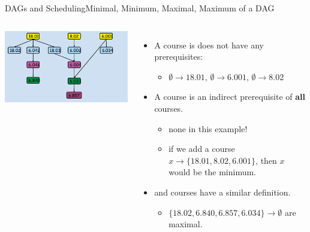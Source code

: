 \begin{frame}{DAGs and Scheduling}{Minimal, Minimum, Maximal, Maximum of a DAG}
  \begin{columns}
      \includegraphics[width=1\textwidth]{../img/greedy_schedule}

    \begin{itemize}
    \item A  course is does not have any prerequisites:
    \begin{itemize}
      \item $\emptyset \to 18.01$, $\emptyset \to 6.001$, $\emptyset \to  8.02$
    \end{itemize}\bigskip

    \item A  course is an indirect prerequisite of {\bf all} courses.
    \begin{itemize}
      \item none in this example!
      \item if we add a course $x \to \{18.01, 8.02, 6.001\}$, then $x$ would be the minimum.
    \end{itemize}\bigskip

    \item {} and  courses have a similar definition.
    \begin{itemize}
      \item $\{18.02, 6.840, 6.857, 6.034\}\to \emptyset$ are maximal.
    \end{itemize}
    \end{itemize}
  \end{columns}
\end{frame}

